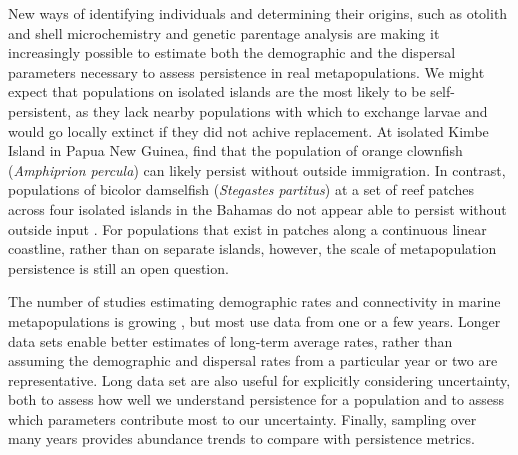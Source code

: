 \documentclass[12pt, oneside]{article}   	%
\begin{document}
New ways of identifying individuals and determining their origins, such as otolith and shell microchemistry and genetic parentage analysis \citep[e.g.][]{wang2004sibship, wang2014estimation} are making it increasingly possible to estimate both the demographic \citep[e.g.][]{carson2011evaluating, hameed2016inverse} and the dispersal \citep[e.g.][]{almany2017larval, daloia_self-recruitment_2013} parameters necessary to assess persistence in real metapopulations. We might expect that populations on isolated islands are the most likely to be self-persistent, as they lack nearby populations with which to exchange larvae and would go locally extinct if they did not achive replacement. At isolated Kimbe Island in Papua New Guinea, \cite{salles_coral_2015} find that the population of orange clownfish (\textit{Amphiprion percula}) can likely persist without outside immigration. In contrast, populations of bicolor damselfish (\textit{Stegastes partitus}) at a set of reef patches across four isolated islands in the Bahamas do not appear able to persist without outside input \citep{johnson2018integrating}. For populations that exist in patches along a continuous linear coastline, rather than on separate islands, however, the scale of metapopulation persistence is still an open question. %

The number of studies estimating demographic rates and connectivity in marine metapopulations is growing \citep[e.g.][]{carson2011evaluating, salles_coral_2015, johnson2018integrating, garavelli2018population}, but most use data from one or a few years. Longer data sets enable better estimates of long-term average rates, rather than assuming the demographic and dispersal rates from a particular year or two are representative. Long data set are also useful for explicitly considering uncertainty, both to assess how well we understand persistence for a population and to assess which parameters contribute most to our uncertainty. Finally, sampling over many years provides abundance trends to compare with persistence metrics.

\end{document}
